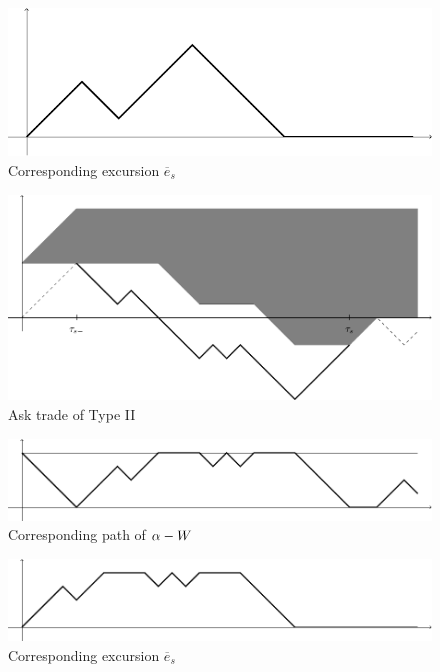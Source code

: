 \documentclass[11pt]{scrartcl}
\begin{document}
\begin{figure}[H]
\includegraphics{AskIe.pdf}
\caption{Corresponding excursion $\overline{e}_s$}
\label{Fig:AskIe}
\end{figure}


\begin{figure}[H]
\includegraphics{AskIIs.pdf}
\caption{Ask trade of Type II}
\label{Fig:AskIIs}
\end{figure}
\begin{figure}[H]
\includegraphics{AskIIx.pdf}
\caption{Corresponding path of $\protect\alpha-W$}
\label{Fig:AskIIx}
\end{figure}
\begin{figure}[H]
\includegraphics{AskIIe.pdf}
\caption{Corresponding excursion $\overline{e}_s$}
\label{Fig:AskIIe}
\end{figure}
\end{document}
